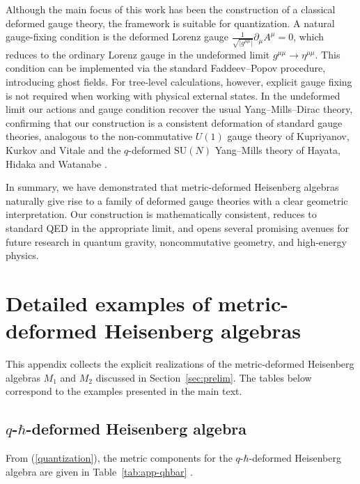 \documentclass[12pt,a4paper]{article}
\theoremstyle{plain}
\theoremstyle{definition}
\begin{document}
Although the main focus of this work has been the construction of a classical deformed gauge theory, the framework is suitable for quantization. A natural gauge-fixing condition is the deformed Lorenz gauge $\frac{1}{\sqrt{|g^{\mu\mu}|}}\partial_\mu A^\mu = 0$, which reduces to the ordinary Lorenz gauge in the undeformed limit $g^{\mu\mu}\to\eta^{\mu\mu}$. This condition can be implemented via the standard Faddeev–Popov procedure, introducing ghost fields. For tree-level calculations, however, explicit gauge fixing is not required when working with physical external states. In the undeformed limit our actions and gauge condition recover the usual Yang–Mills–Dirac theory, confirming that our construction is a consistent deformation of standard gauge theories, analogous to the non-commutative $U(1)$ gauge theory of Kupriyanov, Kurkov and Vitale \cite{Kupriyanov2020} and the $q$-deformed $\mathrm{SU}(N)$ Yang–Mills theory of Hayata, Hidaka and Watanabe \cite{Hayata2026}.

In summary, we have demonstrated that metric-deformed Heisenberg algebras naturally give rise to a family of deformed gauge theories with a clear geometric interpretation. Our construction is mathematically consistent, reduces to standard QED in the appropriate limit, and opens several promising avenues for future research in quantum gravity, noncommutative geometry, and high-energy physics.


\appendix

\section{Detailed examples of metric-deformed Heisenberg algebras}
\label{app:heisenberg-examples}

This appendix collects the explicit realizations of the metric-deformed Heisenberg algebras $M_1$ and $M_2$ discussed in Section~\ref{sec:prelim}. The tables below correspond to the examples presented in the main text.


\subsection{$q$-$\hbar$-deformed Heisenberg algebra}

From (\ref{quantization}), the metric components for the $q$-$\hbar$-deformed Heisenberg algebra are given in Table~\ref{tab:app-qhbar} \cite{Volovich-Arefeva-91}.
\end{document}
